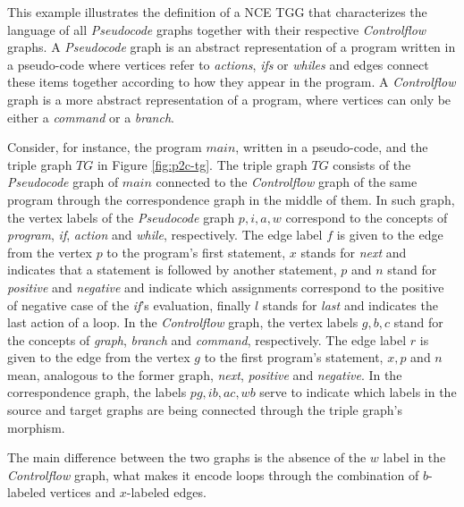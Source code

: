 \documentclass[runningheads]{llncs}
\begin{document}
\begin{example}
	\label{ex:pseudocode2controlflow}
	This example illustrates the definition of a NCE TGG that characterizes the language of all \emph{Pseudocode} graphs together with their respective \emph{Controlflow} graphs. A \emph{Pseudocode} graph is an abstract representation of a program written in a pseudo-code where vertices refer to \textit{actions}, \textit{ifs} or \textit{whiles} and edges connect these items together according to how they appear in the program. A \emph{Controlflow} graph is a more abstract representation of a program, where vertices can only be either a \textit{command} or a \textit{branch}.
	
	Consider, for instance, the program $\mathit{main}$, written in a pseudo-code, and the triple graph $\mathit{TG}$ in Figure \ref{fig:p2c-tg}. The triple graph $\mathit{TG}$ consists of the \emph{Pseudocode} graph of $\mathit{main}$ connected to the \emph{Controlflow} graph of the same program through the correspondence graph in the middle of them. In such graph, the vertex labels of the \emph{Pseudocode} graph $p, i, a, w$ correspond to the concepts of \textit{program}, \textit{if}, \textit{action} and \textit{while}, respectively. The edge label $f$ is given to the edge from the vertex $p$ to the program's first statement, $x$ stands for \textit{next} and indicates that a statement is followed by another statement, $p$ and $n$ stand for \textit{positive} and \textit{negative} and indicate which assignments correspond to the positive of negative case of the \textit{if}'s evaluation, finally $l$ stands for \textit{last} and indicates the last action of a loop. In the \emph{Controlflow} graph, the vertex labels $g, b, c$ stand for the concepts of \textit{graph}, \textit{branch} and \textit{command}, respectively. The edge label $r$ is given to the edge from the vertex $g$ to the first program's statement, $x, p$ and $n$ mean, analogous to the former graph, \textit{next}, \textit{positive} and \textit{negative}. In the correspondence graph, the labels $\mathit{pg}, \mathit{ib}, \mathit{ac}, \mathit{wb}$ serve to indicate which labels in the source and target graphs are being connected through the triple graph's morphism.
	
	The main difference between the two graphs is the absence of the $w$ label in the \emph{Controlflow} graph, what makes it encode loops through the combination of $b$-labeled vertices and $x$-labeled edges.
	

\end{example}
\end{document}
